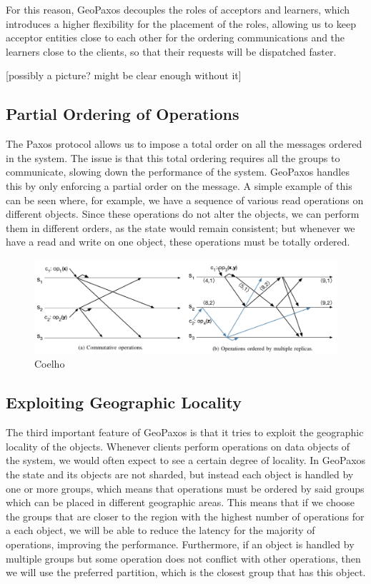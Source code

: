 For this reason, GeoPaxos decouples the roles of acceptors and learners, which introduces a higher flexibility for the placement of the roles, allowing us to keep acceptor entities close to each other for the ordering communications and the learners close to the clients, so that their requests will be dispatched faster.

[possibly a picture? might be clear enough without it]

\subsection{Partial Ordering of Operations}
The Paxos protocol allows us to impose a total order on all the messages ordered in the system. The issue is that this total ordering requires all the groups to communicate, slowing down the performance of the system. GeoPaxos handles this by only enforcing a partial order on the message.
A simple example of this can be seen where, for example, we have a sequence of various read operations on different objects. Since these operations do not alter the objects, we can perform them in different orders, as the state would remain consistent; but whenever we have a read and write on one object, these operations must be totally ordered.

\begin{figure}[htb]
  \centering
  \includegraphics[width=\textwidth,height=\textheight,keepaspectratio]{img/partial-ordering.png}

  \caption[The architecture of the system]{ Coelho \texttrademark }
  \label{fig:partial-ordering}
\end{figure}

\subsection{Exploiting Geographic Locality}
The third important feature of GeoPaxos is that it tries to exploit the geographic locality of the objects. Whenever clients perform operations on data objects of the system, we would often expect to see a certain degree of locality. In GeoPaxos the state and its objects are not sharded, but instead each object is handled by one or more groups, which means that operations must be ordered by said groups which can be placed in different geographic areas. This means that if we choose the groups that are closer to the region with the highest number of operations for a each object, we will be able to reduce the latency for the majority of operations, improving the performance. Furthermore, if an object is handled by multiple groups but some operation does not conflict with other operations, then we will use the preferred partition, which is the closest group that has this object.